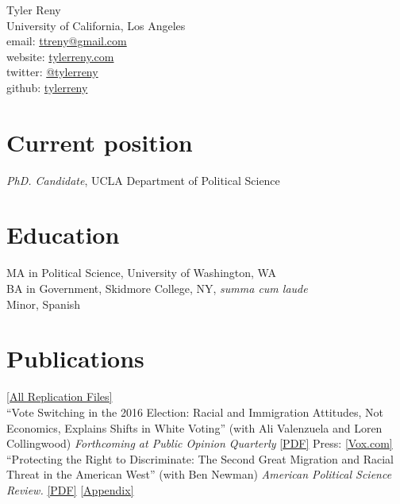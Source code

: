 \documentclass[11pt, a4paper]{article}
\newcommand{\years}[1]{\marginnote{\scriptsize #1}}
\begin{document}
{\LARGE Tyler Reny}\\[1cm]
 University of California, Los Angeles\\
email: \href{mailto:ttreny@gmail.com}{ttreny@gmail.com}\\
website: \href{http://www.tylerreny.com}{tylerreny.com}\\ 
twitter: \href{http://www.twitter.com/tylerreny}{@tylerreny}\\ 
github: \href{https://github.com/tylerreny}{tylerreny}\\ 

\section*{Current position}
\emph{PhD. Candidate}, UCLA Department of Political Science

\section*{Education}
\years{2015}\textsc{MA} in Political Science, University of Washington, WA\\
\years{2011}\textsc{BA} in Government, Skidmore College, NY, \textit{summa cum laude}\\
Minor, Spanish

\section*{Publications}
\href{https://dataverse.harvard.edu/dataverse/tylerreny}{[All Replication Files]}\\

\years{2018}``Vote Switching in the 2016 Election: Racial and Immigration Attitudes, Not Economics, Explains Shifts in White Voting'' (with Ali Valenzuela and Loren Collingwood) \textit{Forthcoming at Public Opinion Quarterly} \href{http://tylerreny.github.io/pdf/pubs/final_submission_reny_etal_poq_public.pdf}{[PDF]} Press: \href{https://www.vox.com/policy-and-politics/2018/10/16/17980820/trump-obama-2016-race-racism-class-economy-2018-midterm}{[Vox.com]}\\

\years{} ``Protecting the Right to Discriminate: The Second Great Migration and Racial Threat in the American West'' (with Ben Newman) \textit{American Political Science Review.} \href{http://tylerreny.github.io/pdf/pubs/reny_newman_apsr_2018.pdf}{[PDF]} \href{http://tylerreny.github.io/pdf/pubs/reny_newman_apsr_2018_SI.pdf}{[Appendix]}\\
\end{document}
